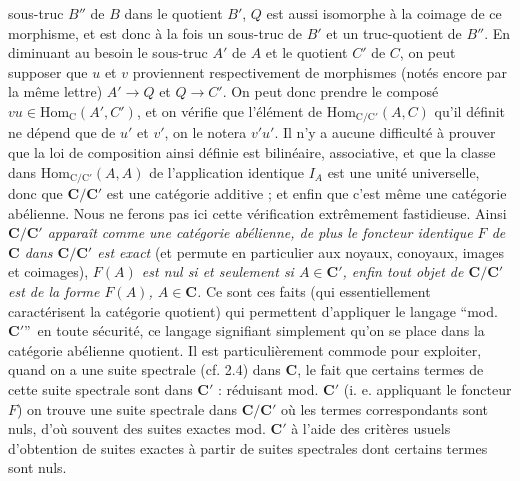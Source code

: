 
\noindent sous-truc $B''$ de $B$ dans le quotient $B'$, $Q$ est aussi
isomorphe à la coimage de ce morphisme, et est donc à la fois un sous-truc de
$B'$ et un truc-quotient de $B''$. En diminuant au besoin le sous-truc $A'$ de
$A$ et le quotient $C'$ de $C$, on peut supposer que $u$ et $v$ proviennent
respectivement de morphismes (notés encore par la même lettre)
$A'\to Q$ et $Q\to C'$. On peut donc prendre le
composé $vu\in\mathrm{Hom}_{\mathrm{C}}(A',C')$, et on vérifie que l'élément de
$\mathrm{Hom}_{\mathrm{C}/\mathrm{C}'}(A,C)$ qu'il définit ne dépend que de $u'$ et $v'$, on le
notera $v'u'$. Il n'y a aucune difficulté à prouver que la loi de composition
ainsi définie est bilinéaire, associative, et que la classe dans
$\mathrm{Hom}_{\mathrm{C}/\mathrm{C}'}(A,A)$ de l'application identique $I_A$ est une unité
universelle, donc que $\mathbf{C}/\mathbf{C}'$ est une catégorie additive ; et enfin que c'est
même une catégorie abélienne. Nous ne ferons pas ici cette vérification
extrêmement fastidieuse.
Ainsi \textit{$\mathbf{C}/\mathbf{C}'$ apparaît comme une catégorie abélienne, de plus le
foncteur identique $F$ de $\mathbf{C}$ dans $\mathbf{C}/\mathbf{C}'$ est exact} (et permute en
particulier aux noyaux, conoyaux, images et coimages), \textit{$F(A)$ est nul
si et seulement si $A\in \mathbf{C}'$, enfin tout objet de $\mathbf{C}/\mathbf{C}'$ est de la forme
$F(A)$, $A\in \mathbf{C}$.} Ce sont ces faits (qui essentiellement caractérisent la
catégorie quotient) qui permettent d'appliquer le langage
\textquotedblleft mod. $\mathbf{C}'$\textquotedblright\ en toute sécurité, ce langage
signifiant simplement qu'on se place dans la catégorie abélienne quotient.
Il est particulièrement commode pour exploiter, quand on a une suite spectrale
(cf. 2.4) dans $\mathbf{C}$, le fait que certains termes de cette suite spectrale sont
dans $\mathbf{C}'$ : réduisant mod. $\mathbf{C}'$ (i. e. appliquant le foncteur $F$) on trouve
une suite spectrale dans $\mathbf{C}/\mathbf{C}'$ où les termes correspondants sont nuls, d'où
souvent des suites exactes mod. $\mathbf{C}'$ à l'aide des critères usuels d'obtention
de suites exactes à partir de suites spectrales dont certains termes sont
nuls.


